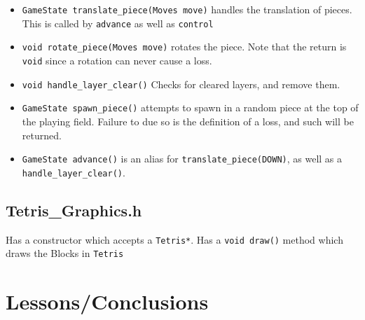 \documentclass[letterpaper, 12pt]{article}
\begin{document}
\begin{itemize}
\begin{itemize}
            \item \verb|GameState translate_piece(Moves move)| handles the translation of pieces. This is called by \verb|advance| as well as \verb|control|
            \item \verb|void rotate_piece(Moves move)| rotates the piece.
                Note that the return is \verb|void| since a rotation can never cause a loss.
            \item \verb|void handle_layer_clear()| Checks for cleared layers, and remove them.
            \item \verb|GameState spawn_piece()| attempts to spawn in a random piece at the top of the playing field.
                Failure to due so is the definition of a loss, and such will be returned.
            \item \verb|GameState advance()| is an alias for \verb|translate_piece(DOWN)|, as well as a \verb|handle_layer_clear()|.
        \end{itemize}
\end{itemize}
\subsection{Tetris\_Graphics.h}
Has a constructor which accepts a \verb|Tetris*|.
Has a \verb|void draw()| method which draws the Blocks in \verb|Tetris|
\subsection{}
\section{Lessons/Conclusions}
\end{document}
